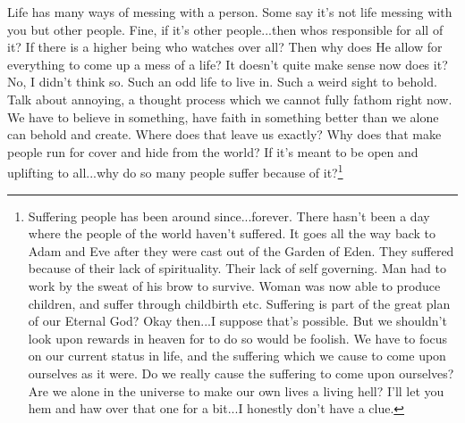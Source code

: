 Life has many ways of messing with a person. Some say it's not life messing with
you but other people. Fine, if it's other people...then whos responsible for all
of it? If there is a higher being who watches over all? Then why does He allow
for everything to come up a mess of a life? It doesn't quite make sense now does
it? No, I didn't think so. Such an odd life to live in. Such a weird sight to
behold. Talk about annoying, a thought process which we cannot fully fathom
right now. We have to believe in something, have faith in something better than
we alone can behold and create. Where does that leave us exactly? Why does that
make people run for cover and hide from the world? If it's meant to be open and
uplifting to all...why do so many people suffer because of it?\footnote{
Suffering people has been around since...forever. There hasn't been a day where
the people of the world haven't suffered. It goes all the way back to Adam and
Eve after they were cast out of the Garden of Eden. They suffered because of
their lack of spirituality. Their lack of self governing. Man had to work by the
sweat of his brow to survive. Woman was now able to produce children, and suffer
through childbirth etc. Suffering is part of the great plan of our Eternal God?
Okay then...I suppose that's possible. But we shouldn't look upon rewards in
heaven for to do so would be foolish. We have to focus on our current status in
life, and the suffering which we cause to come upon ourselves as it were. Do we
really cause the suffering to come upon ourselves? Are we alone in the universe
to make our own lives a living hell? I'll let you hem and haw over that one for
a bit...I honestly don't have a clue.
}